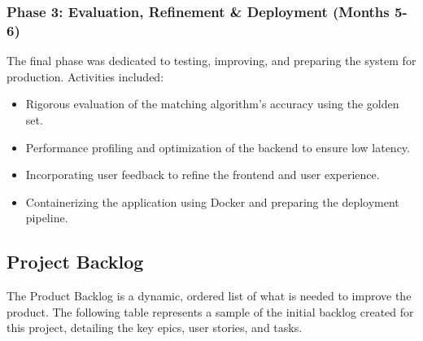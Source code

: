 \subsubsection{Phase 3: Evaluation, Refinement \& Deployment (Months 5-6)}
The final phase was dedicated to testing, improving, and preparing the system for production. Activities included:
\begin{itemize}
    \item Rigorous evaluation of the matching algorithm's accuracy using the golden set.
    \item Performance profiling and optimization of the backend to ensure low latency.
    \item Incorporating user feedback to refine the frontend and user experience.
    \item Containerizing the application using Docker and preparing the deployment pipeline.
\end{itemize}

\subsection{Project Backlog}
The Product Backlog is a dynamic, ordered list of what is needed to improve the product. The following table represents a sample of the initial backlog created for this project, detailing the key epics, user stories, and tasks.

